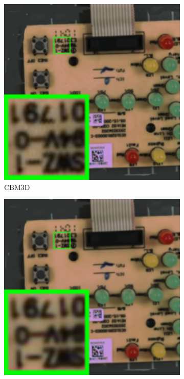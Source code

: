 \begin{figure}
\begin{subfigure}[t]{0.19\textwidth}
        \includegraphics[width=1\textwidth]{images/mcwnnm/nc/resize_br_CBM3D_circuit.png}
		\caption{CBM3D}
    \end{subfigure}
    \hfill
    \begin{subfigure}[t]{0.19\textwidth}
        \centering
        \includegraphics[width=1\textwidth]{images/mcwnnm/nc/resize_br_MLP_circuit.png}

\end{subfigure}
\end{figure}
